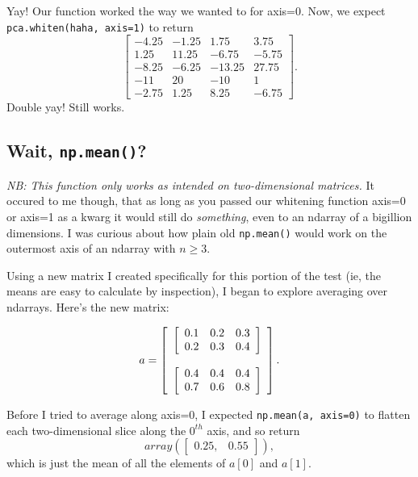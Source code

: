 \documentclass{article}
\begin{document}
Yay!  Our function worked the way we wanted to for axis=0.  Now, we
expect \verb|pca.whiten(haha, axis=1)| to return
\[ \left[
  \begin{array}{cccc}
    -4.25 & -1.25 & 1.75 & 3.75 \\
    1.25 & 11.25 & -6.75 & -5.75 \\
    -8.25 & -6.25 & -13.25 & 27.75 \\
    -11 & 20 & -10 & 1 \\
    -2.75 & 1.25 & 8.25 & -6.75
  \end{array} \right]. \]
Double yay!  Still works.

\subsection{Wait, \texttt{np.mean()}?}
\label{sec:mean}

\emph{NB: This function only works as intended on two-dimensional
  matrices.}  It occured to me though, that as long as you passed our
whitening function axis=0 or axis=1 as a kwarg it would still do
\emph{something}, even to an ndarray of a bigillion dimensions. I was curious about how
plain old \verb|np.mean()| would work on the outermost axis of an ndarray with
$n\geq3$.

Using a new matrix I created specifically for this portion of the test
(ie, the means are easy to calculate by inspection), I began to explore
averaging over ndarrays.  Here's the new matrix:

\[a=\left[
  \begin{array}{c}
    \left[\begin{array}[c]{ccc}
      0.1 & 0.2 & 0.3 \\
      0.2 & 0.3 & 0.4
    \end{array} \right] \\

  \\

  \left[\begin{array}[c]{ccc}
      0.4 & 0.4 & 0.4 \\
      0.7 & 0.6 & 0.8
  \end{array} \right]
  \end{array} \right].
\]

Before I tried to average along axis=0, I expected
\verb|np.mean(a, axis=0)| to flatten each two-dimensional slice along
the $0^{th}$ axis, and so return
\[array(\left[
\begin{array}{cc}
  0.25, & 0.55
\end{array} \right]),
\]
which is just the mean of all the elements of $a[0]$ and $a[1]$.
\end{document}

